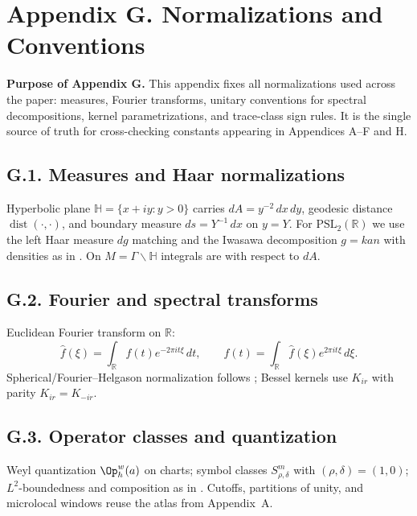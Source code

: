 \appendix
\section*{Appendix G. Normalizations and Conventions}
\label{appG:root}

\noindent\textbf{Purpose of Appendix G.}
This appendix fixes all normalizations used across the paper:
measures, Fourier transforms, unitary conventions for spectral decompositions,
kernel parametrizations, and trace-class sign rules. It is the single source of truth
for cross-checking constants appearing in Appendices A–F and H.

\subsection*{G.1. Measures and Haar normalizations}
\label{appG:measures}
\noindent
Hyperbolic plane $\mathbb H=\{x+iy:y>0\}$ carries $dA=y^{-2}\,dx\,dy$, geodesic distance
$\operatorname{dist}(\cdot,\cdot)$, and boundary measure $ds=Y^{-1}\,dx$ on $y=Y$.
For $\mathrm{PSL}_2(\mathbb{R})$ we use the left Haar measure $dg$ matching
\cite[Ch.~I]{Helgason} and the Iwasawa decomposition $g=kan$ with densities as in
\cite[§7.2]{Iwaniec2002}. On $M=\Gamma\backslash\mathbb H$ integrals are with respect to $dA$.

\subsection*{G.2. Fourier and spectral transforms}
\label{appG:fourier}
\noindent
Euclidean Fourier transform on $\mathbb R$:
\[
\widehat{f}(\xi)=\int_{\mathbb R} f(t)e^{-2\pi i t\xi}\,dt,\qquad
f(t)=\int_{\mathbb R}\widehat{f}(\xi)e^{2\pi i t\xi}\,d\xi.
\]
Spherical/Fourier–Helgason normalization follows \cite[Ch.~IV]{Helgason};
Bessel kernels use $K_{ir}$ with parity $K_{ir}=K_{-ir}$.

\subsection*{G.3. Operator classes and quantization}
\label{appG:pdo}
\noindent
Weyl quantization $\Op_h^w(a)$ on charts; symbol classes $S^m_{\rho,\delta}$ with $(\rho,\delta)=(1,0)$;
$L^2$-boundedness and composition as in \cite[Thm.~4.23]{Zworski}.
Cutoffs, partitions of unity, and microlocal windows reuse the atlas from Appendix~A.

